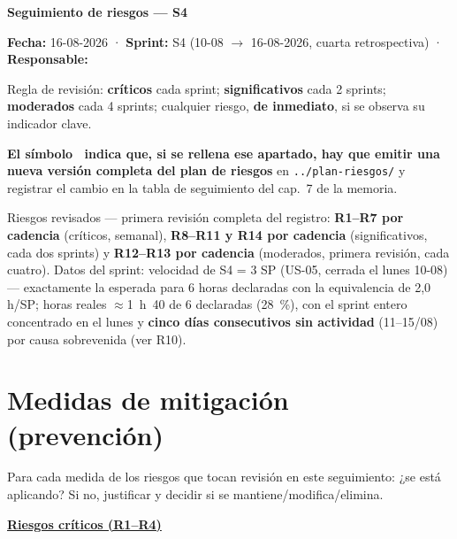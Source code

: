 \documentclass[11pt,a4paper]{article}
\begin{document}
\begin{center}
  {\LARGE\bfseries Seguimiento de riesgos — S4}\\[6pt]
\end{center}

\textbf{Fecha:} 16-08-2026 · \textbf{Sprint:} S4 (10-08 \(\to\) 16-08-2026, cuarta retrospectiva) · \textbf{Responsable:} \thesisAuthor

Regla de revisión: \textbf{críticos} cada sprint; \textbf{significativos} cada 2 sprints; \textbf{moderados} cada 4 sprints; cualquier riesgo, \textbf{de inmediato}, si se observa su indicador clave.

\textbf{El símbolo \updatesymbol\ indica que, si se rellena ese apartado, hay que emitir una nueva versión completa del plan de riesgos} en \texttt{../plan-riesgos/} y registrar el cambio en la tabla de seguimiento del cap.~7 de la memoria.

Riesgos revisados — primera revisión completa del registro: \textbf{R1--R7 por cadencia} (críticos, semanal), \textbf{R8--R11 y R14 por cadencia} (significativos, cada dos sprints) y \textbf{R12--R13 por cadencia} (moderados, primera revisión, cada cuatro).
Datos del sprint: velocidad de S4 = 3 SP (US-05, cerrada el lunes 10-08) — exactamente la esperada para 6 horas declaradas con la equivalencia de 2,0 h/SP; horas reales \(\approx\)1~h~40 de 6 declaradas (28~\%), con el sprint entero concentrado en el lunes y \textbf{cinco días consecutivos sin actividad} (11--15/08) por causa sobrevenida (ver R10).

\bigline

\section{Medidas de mitigación (prevención)}

Para cada medida de los riesgos que tocan revisión en este seguimiento: ¿se está aplicando?
Si no, justificar y decidir si se mantiene/modifica/elimina.

\underline{\textbf{Riesgos críticos (R1--R4)}}
\end{document}
